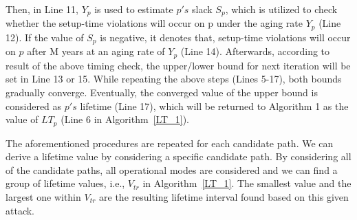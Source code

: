 Then, in Line 11, $Y_{p}$ is used to estimate $p's$ slack $S_{p}$, which is utilized to check whether the setup-time violations will occur on p under the aging rate $Y_{p}$ (Line 12). If the value of $S_{p}$ is negative, it denotes that, setup-time violations will occur on $p$ after M years at an aging rate of $Y_{p}$ (Line 14). Afterwards, according to result of the above timing check, the upper/lower bound for next iteration will be set in Line 13 or 15. While repeating the above steps (Lines 5-17), both bounds gradually converge. Eventually, the converged value of the upper bound is considered as $p's$ lifetime (Line 17), which will be returned to Algorithm 1 as the value of $LT_{p}$ (Line 6 in Algorithm~\ref{LT_1}).

The aforementioned procedures are repeated for each candidate path. We can derive a lifetime value by considering a specific candidate path. By considering all of the candidate
paths, all operational modes are considered and we can find a group of lifetime values, i.e., $V_{tr}$ in Algorithm~\ref{LT_1}. The smallest value and the largest one within $V_{tr}$ are the resulting lifetime interval found based on this given attack.